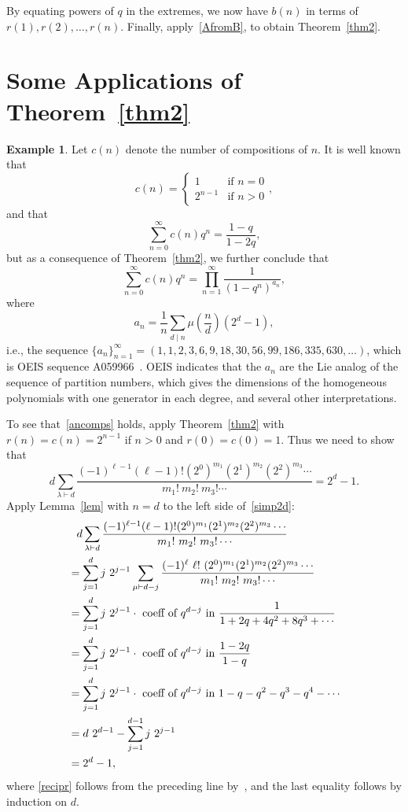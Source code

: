 \documentclass[10pt]{article}
\theoremstyle{definition}
\newtheorem{example}[theorem]{Example}
\numberwithin{theorem}{section}
\numberwithin{equation}{section}
\begin{document}
By equating powers of $q$ in the extremes, we now have $b(n)$ in terms of
$r(1), r(2), \dots, r(n)$.  Finally, apply~\eqref{AfromB}, to obtain Theorem~\ref{thm2}.

\section{Some Applications of Theorem~\ref{thm2}}
\begin{example}
Let $c(n)$ denote the number of compositions of $n$.  It is well known that 
\[ c(n) = 
\begin{cases}  
  1 &\mbox{if $n=0$} \\
  2^{n-1} &\mbox{if $n>0$}
\end{cases} ,
\]
and that 
\[ \sum_{n=0}^\infty c(n) q^n = \frac{1-q}{1-2q}, \]
but as a consequence of Theorem~\ref{thm2}, we further conclude that
\[ \sum_{n=0}^\infty c(n) q^n = \prod_{n=1}^\infty \frac{1}{(1-q^n)^{a_n}}, \] where
\begin{equation} \label{ancomps}
 a_n = \frac{1}{n} \sum_{d\mid n} \mu\left( \frac{n}{d} \right) (2^d - 1), 
 \end{equation}
i.e., the sequence $\{ a_n\}_{n=1}^\infty = (1,1,2,3,6,9,18,30,56,99,186,335, 630, \dots)$, which is OEIS sequence
A059966~\cite{oeisA059966}.   
OEIS indicates that the $a_n$ are the Lie analog of the sequence of partition numbers,
which gives the dimensions of the homogeneous polynomials with one generator in
each degree, and several other interpretations.

To see that~\eqref{ancomps} holds, apply Theorem~\ref{thm2} with $r(n) = c(n) = 2^{n-1}$ if
$n>0$ and $r(0) = c(0) = 1$.  Thus we need to show that
\begin{equation} \label{simp2d}
 d\sum_{\lambda\vdash d} \frac{(-1)^{\ell - 1} (\ell - 1)!  (2^0)^{m_1} (2^1)^{m_2} (2^2)^{m_3} \cdots}
 {m_1! \ m_2! \ m_3! \cdots } = 2^d - 1.
 \end{equation}
Apply Lemma~\ref{lem} with $n = d$ to the left side of~\eqref{simp2d}:
 \begin{align}
&  \phantom{ = }d\sum_{\lambda\vdash d} \frac{(-1)^{\ell - 1} (\ell - 1)!  (2^0)^{m_1} (2^1)^{m_2} (2^2)^{m_3} \cdots}
 {m_1! \ m_2! \ m_3! \cdots } \notag \\ & =
 \sum_{j=1}^d j \ 2^{j-1} \sum_{\mu \vdash d-j} \frac{(-1)^\ell \ \ell! \ (2^0)^{m_1} 
 (2^1)^{m_2} (2^2)^{m_3} \cdots}{m_1! \ m_2! \ m_3! \cdots } \notag \\
 & = \sum_{j=1}^d j \ 2^{j-1} \cdot \mbox{ coeff of } q^{d-j} \mbox{ in } \frac{1}{1+2q+4q^2+8q^3
 +\cdots} \label{recipr} \\
 & = \sum_{j=1}^d j \ 2^{j-1} \cdot \mbox{ coeff of } q^{d-j} \mbox{ in } \frac{1-2q}{1-q} \notag \\
 & = \sum_{j=1}^d j \ 2^{j-1} \cdot \mbox{ coeff of } q^{d-j} \mbox{ in } 1 -q -q^2 -q^3 - q^4 - \cdots
 \notag\\
 & = d\ 2^{d-1} - \sum_{j=1}^{d-1} j\ 2^{j - 1} \notag \\
 & = 2^d - 1, \notag
 \end{align}
 where \eqref{recipr} follows from the preceding line by~\cite[p. 3, Lemma 1]{ss22}, and
the last equality follows by induction on $d$.



\end{example}
\end{document}
